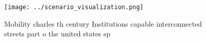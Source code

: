 \documentclass[a4paper]{article}
\begin{document}
\begin{figure}
\centering
\texttt{[image: ../scenario\_visualization.png]}
\caption{Mobility charles th century Institutions capable interconnected streets part o the united states sp
}
\end{figure}
 
\end{document}
